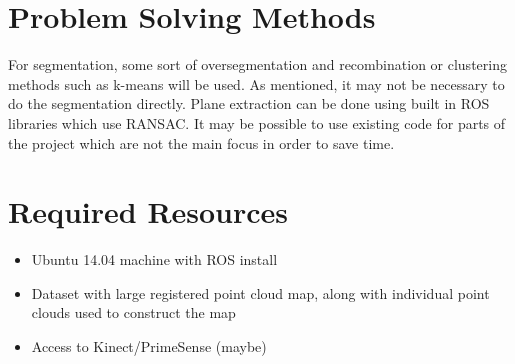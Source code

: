 \documentclass[10pt,a4paper]{article}
\begin{document}
\section{Problem Solving Methods}
For segmentation, some sort of oversegmentation and recombination or clustering
methods such as k-means will be used. As mentioned, it may not be necessary to
do the segmentation directly. Plane extraction can be done using built in ROS
libraries which use RANSAC. It may be possible to use existing code for parts of
the project which are not the main focus in order to save time.
\section{Required Resources}
\begin{itemize}
\item Ubuntu 14.04 machine with ROS install
\item Dataset with large registered point cloud map, along with individual
  point clouds used to construct the map
\item Access to Kinect/PrimeSense (maybe)
\end{itemize}
\end{document}
